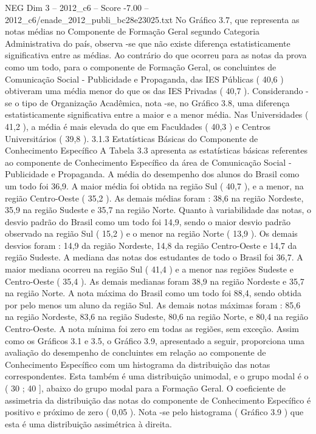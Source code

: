 \begin{textsample}{NEG Dim 3 – 2012\_c6 – Score -7.00 – 2012\_c6/enade\_2012\_publi\_bc28e23025.txt}
No Gráfico 3.7, que representa as notas médias no Componente de Formação Geral segundo Categoria Administrativa do país, observa -se que não existe diferença estatisticamente significativa entre as médias.
Ao contrário do que ocorreu para as notas da prova como um todo, para o componente de Formação Geral, os concluintes de Comunicação Social - Publicidade e Propaganda, das IES Públicas ( 40,6 ) obtiveram uma média menor do que os das IES Privadas ( 40,7 ).
Considerando -se o tipo de Organização Acadêmica, nota -se, no Gráfico 3.8, uma diferença estatisticamente significativa entre a maior e a menor média.
Nas Universidades ( 41,2 ), a média é mais elevada do que em Faculdades ( 40,3 ) e Centros Universitários ( 39,8 ). 3.1.3 Estatísticas Básicas do Componente de Conhecimento Específico A Tabela 3.3 apresenta as estatísticas básicas referentes ao componente de Conhecimento Específico da área de Comunicação Social - Publicidade e Propaganda.
A média do desempenho dos alunos do Brasil como um todo foi 36,9.
A maior média foi obtida na região Sul ( 40,7 ), e a menor, na região Centro-Oeste ( 35,2 ).
As demais médias foram : 38,6 na região Nordeste, 35,9 na região Sudeste e 35,7 na região Norte.
Quanto à variabilidade das notas, o desvio padrão do Brasil como um todo foi 14,9, sendo o maior desvio padrão observado na região Sul ( 15,2 ) e o menor na região Norte ( 13,9 ).
Os demais desvios foram : 14,9 da região Nordeste, 14,8 da região Centro-Oeste e 14,7 da região Sudeste.
A mediana das notas dos estudantes de todo o Brasil foi 36,7.
A maior mediana ocorreu na região Sul ( 41,4 ) e a menor nas regiões Sudeste e Centro-Oeste ( 35,4 ).
As demais medianas foram 38,9 na região Nordeste e 35,7 na região Norte.
A nota máxima do Brasil como um todo foi 88,4, sendo obtida por pelo menos um aluno da região Sul.
As demais notas máximas foram : 85,6 na região Nordeste, 83,6 na região Sudeste, 80,6 na região Norte, e 80,4 na região Centro-Oeste.
A nota mínima foi zero em todas as regiões, sem exceção.
Assim como os Gráficos 3.1 e 3.5, o Gráfico 3.9, apresentado a seguir, proporciona uma avaliação do desempenho de concluintes em relação ao componente de Conhecimento Específico com um histograma da distribuição das notas correspondentes.
Esta também é uma distribuição unimodal, e o grupo modal é o ( 30 ; 40 ], abaixo do grupo modal para a Formação Geral.
O coeficiente de assimetria da distribuição das notas do componente de Conhecimento Específico é positivo e próximo de zero ( 0,05 ).
Nota -se pelo histograma ( Gráfico 3.9 ) que esta é uma distribuição assimétrica à direita.

\end{textsample}
